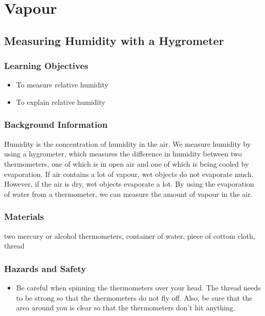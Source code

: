 \section{Vapour}

\subsection{Measuring Humidity with a Hygrometer}

\subsubsection*{Learning Objectives}
\begin{itemize}
\item{To measure relative humidity}
\item{To explain relative humidity}
\end{itemize}

\subsubsection*{Background Information}
Humidity is the concentration of humidity in the air.  We measure humidity by using a hygrometer, which measures the difference in humidity between two thermometers, one of which is in open air and one of which is being cooled by evaporation.  If air contains a lot of vapour, wet objects do not evaporate much.  However, if the air is dry, wet objects evaporate a lot.  By using the evaporation of water from a thermometer, we can measure the amount of vapour in the air.

\subsubsection*{Materials}
two mercury or alcohol thermometers, container of water, piece of cottom cloth, thread

\subsubsection*{Hazards and Safety}
\begin{itemize}
\item{Be careful when spinning the thermometers over your head.  The thread needs to be strong so that the thermometers do not fly off.  Also, be sure that the area around you is clear so that the thermometers don't hit anything.}
\end{itemize}

